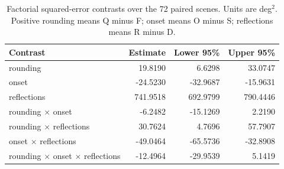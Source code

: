\begin{table}[htbp]\centering\small
\caption{Factorial squared-error contrasts over the 72 paired scenes. Units are deg$^2$. Positive rounding means Q minus F; onset means O minus S; reflections means R minus D.}
\begin{tabular}{@{}lrrr@{}}\toprule
Contrast & Estimate & Lower 95\% & Upper 95\%\\\midrule
rounding & 19.8190 & 6.6298 & 33.0747\\
onset & -24.5230 & -32.9687 & -15.9631\\
reflections & 741.9518 & 692.9799 & 790.4446\\
rounding $\times$ onset & -6.2482 & -15.1269 & 2.2190\\
rounding $\times$ reflections & 30.7624 & 4.7696 & 57.7907\\
onset $\times$ reflections & -49.0464 & -65.5736 & -32.8908\\
rounding $\times$ onset $\times$ reflections & -12.4964 & -29.9539 & 5.1419\\
\bottomrule\end{tabular}\end{table}
